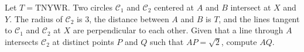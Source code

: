 Let $T=\text{TNYWR}$. Two circles $\mathcal{C}_1$ and $\mathcal{C}_2$ centered at $A$ and $B$ intersect at $X$ and $Y$. The radius of $\mathcal{C}_2$ is $3$, the distance between $A$ and $B$ is $T$, and the lines tangent to $\mathcal{C}_1$ and $\mathcal{C}_2$ at $X$ are perpendicular to each other. Given that a line through $A$ intersects $\mathcal{C}_2$ at distinct points $P$ and $Q$ such that $AP=\sqrt{2}$, compute $AQ$.